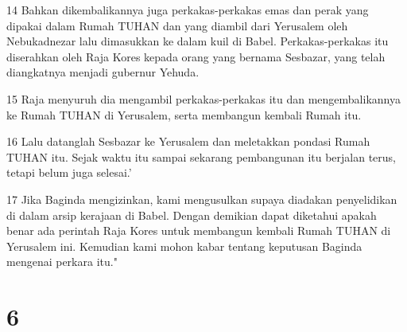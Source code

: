 \par 14 Bahkan dikembalikannya juga perkakas-perkakas emas dan perak yang dipakai dalam Rumah TUHAN dan yang diambil dari Yerusalem oleh Nebukadnezar lalu dimasukkan ke dalam kuil di Babel. Perkakas-perkakas itu diserahkan oleh Raja Kores kepada orang yang bernama Sesbazar, yang telah diangkatnya menjadi gubernur Yehuda.
\par 15 Raja menyuruh dia mengambil perkakas-perkakas itu dan mengembalikannya ke Rumah TUHAN di Yerusalem, serta membangun kembali Rumah itu.
\par 16 Lalu datanglah Sesbazar ke Yerusalem dan meletakkan pondasi Rumah TUHAN itu. Sejak waktu itu sampai sekarang pembangunan itu berjalan terus, tetapi belum juga selesai.'
\par 17 Jika Baginda mengizinkan, kami mengusulkan supaya diadakan penyelidikan di dalam arsip kerajaan di Babel. Dengan demikian dapat diketahui apakah benar ada perintah Raja Kores untuk membangun kembali Rumah TUHAN di Yerusalem ini. Kemudian kami mohon kabar tentang keputusan Baginda mengenai perkara itu."

\chapter{6}

